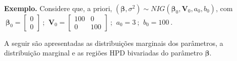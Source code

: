 \documentclass[
]{book}
\begin{document}
\(~\)

\textbf{Exemplo.} Considere que, a priori, \((\boldsymbol{\beta},\sigma^2) \sim \textit{NIG}\left(\boldsymbol{\beta}_0, \boldsymbol{V}_0, a_0, b_0\right)\), com \(~\boldsymbol{\beta}_0 = \left[\begin{array}{c} 0\\0\end{array}\right]~\);
\(~\boldsymbol{V}_0 = \left[\begin{array}{cc} 100 & 0\\ 0 & 100\end{array}\right] ~\); \(~a_0 = 3~\); \(~b_0 = 100~\).

A seguir são apresentadas as distribuições marginais dos parâmetros, a distribuição marginal e as regiões HPD bivariadas do parâmetro \(\boldsymbol{\beta}\).
\end{document}
